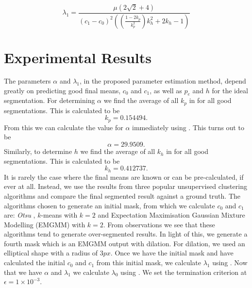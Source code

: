 \begin{equation}
	\lambda_1 = \frac{\mu \left( 2\sqrt{2}+4\right)}{(c_1-c_0)^2\left( \left( \frac{1-2k_p}{k_p^2} \right)k_h^2 +2k_h -1 \right)}
	\label{eq:lambda1fromkpandkh}
\end{equation}

\section{Experimental Results}
\label{sec:cvgc_experimentalresults}

The parameters $\alpha$ and $\lambda_1$, in the proposed parameter estimation method, depend greatly on predicting good final means, $c_0$ and $c_1$, as well as $p_e$ and $h$ for the ideal segmentation. For determining $\alpha$ we find the average of all $k_p$ in  for all good segmentations. This is calculated to be
\begin{equation*}
	k_p = 0.154494.
\end{equation*}
From this we can calculate the value for $\alpha$ immediately using . This turns out to be
\begin{equation}
\alpha = 29.9509.
\end{equation}
Similarly, to determine $h$ we find the average of all $k_h$ in  for all good segmentations. This is calculated to be
\begin{equation*}
	k_h = 0.412737.
\end{equation*}
It is rarely the case where the final means are known or can be pre-calculated, if ever at all. Instead, we use the results from three popular unsupervised clustering algorithms and compare the final segmented result against a ground truth. The algorithms chosen to generate an initial mask, from which we calculate $c_0$ and $c_1$ are: \textit{Otsu} \citep{Otsu1979}, $k$-means \citep{Kanungo2002} with $k=2$ and Expectation Maximisation Gaussian Mixture Modelling (EMGMM) \citep{Figueiredo2002} with $k=2$. From observations we see that these algorithms tend to generate over-segmented results. In light of this, we generate a fourth mask which is an EMGMM output with dilation. For dilation, we used an elliptical shape with a radius of $3px$. Once we have the initial mask and have calculated the initial $c_0$ and $c_1$ from this initial mask, we calculate $\lambda_1$ using . Now that we have $\alpha$ and $\lambda_1$ we calculate $\lambda_0$ using . We set the termination criterion at $\epsilon=1 \times 10^{-3}$.

